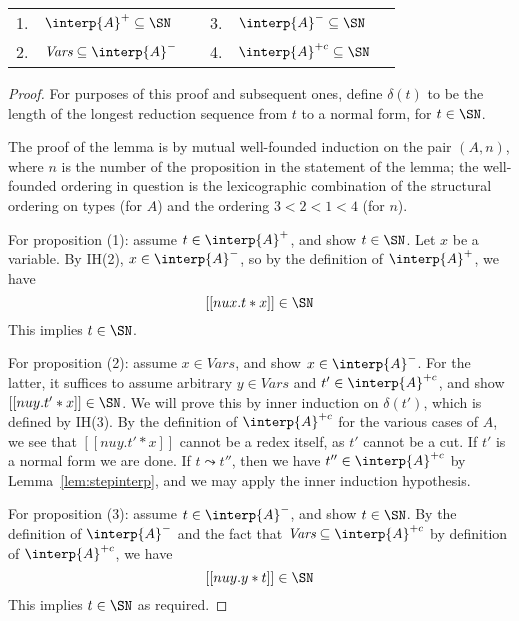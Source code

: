 \begin{lemma}[SN interpretations]
\label{lem:sninterp}

\begin{tabular}{llllll}
1. & $\interp{A}^+ \subseteq \SN$ & \hspace{2cm} & 3. & $\interp{A}^- \subseteq \SN$\\
2. & $\textit{Vars}\subseteq \interp{A}^-$ & \hspace{2cm} & 4. & $\interp{A}^{+c} \subseteq \SN$
\end{tabular}
\end{lemma}
\begin{proof}
  For purposes of this proof and subsequent ones, define $\delta(t)$ to be
  the length of the longest reduction sequence from $t$ to a normal form, for
  $t\in\SN$.

  The proof of the lemma is by mutual well-founded induction on the
  pair $(A,n)$, where $n$ is the number of the proposition in the
  statement of the lemma; the well-founded ordering in question is the
  lexicographic combination of the structural ordering on types (for $A$) 
  and the ordering $3 < 2 < 1 < 4$ (for $n$).

  For proposition (1): assume $t\in\interp{A}^+$, and show $t\in\SN$.
  Let $x$ be a variable.  By IH(2), $x\in\interp{A}^-$, so by the
  definition of $\interp{A}^+$, we have
\[
  [[ nu x . t * x]] \in \SN
\]
  This implies $t\in\SN$.

  For proposition (2): assume $x\in\textit{Vars}$, and show
  $x\in\interp{A}^-$.  For the latter, it suffices to assume arbitrary
  $y\in\textit{Vars}$ and $t'\in\interp{A}^{+c}$, and show $[[nu y
  . t' * x]] \in \SN$.  We will prove this by inner induction on
  $\delta(t')$, which is defined by IH(3).  By the definition of
  $\interp{A}^{+c}$ for the various cases of $A$, we see that $[[nu y
  . t' * x]]$ cannot be a redex itself, as $t'$ cannot be a cut.  If
  $t'$ is a normal form we are done.  If $t\leadsto t''$, then we have
  $t''\in\interp{A}^{+c}$ by Lemma~\ref{lem:stepinterp}, and we may
  apply the inner induction hypothesis.

  For proposition (3): assume $t\in\interp{A}^-$, and show $t\in\SN$.
  By the definition of $\interp{A}^-$ and the fact that $\textit{Vars}\subseteq\interp{A}^{+c}$
  by definition of $\interp{A}^{+c}$, we have 
\[
  [[nu y . y * t]] \in \SN
\]
  This implies $t\in\SN$ as required.


\end{proof}
